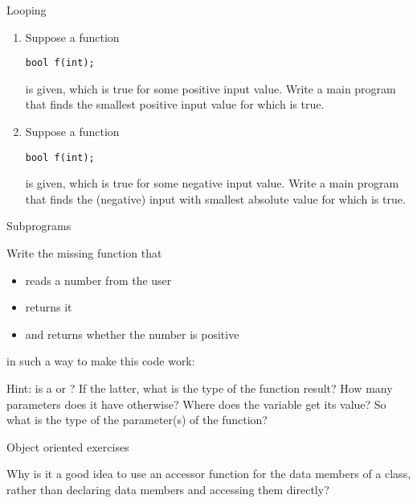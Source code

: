  {Looping}

\begin{enumerate}
\item Suppose a function
\begin{verbatim}
bool f(int);
\end{verbatim}
is given, which is true for some positive input value. Write a main program that
finds the smallest positive input value for which  is true.
\item Suppose a function
\begin{verbatim}
bool f(int);
\end{verbatim}
is given, which is true for some negative input value. Write a main program that
finds the (negative) input with smallest absolute value for which  is true.
\end{enumerate}

 {Subprograms}

\begin{exercise}
  \label{ex:flooppos}
  Write the missing function  that
  \begin{itemize}
  \item reads a number from the user
  \item returns it
  \item and returns whether the number is positive
  \end{itemize}
  in such a way to make this code work:
  

  Hint: is  a  or ? If the
  latter, what is the type of the function result? How many parameters
  does it have otherwise? Where does the variable  get
  its value? So what is the type of the parameter(s) of the function?
\end{exercise}

 {Object oriented exercises}

\begin{exercise}
  Why is it a good idea to use an accessor function for the data
  members of a class, rather than
  declaring data members  and accessing them directly?
\end{exercise}

